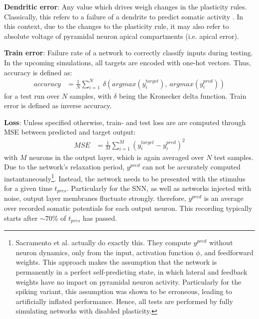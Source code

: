 \textbf{Dendritic error}: Any value which drives weigh changes in the plasticity rules. Classically, this refers to a
failure of a dendrite to predict somatic activity \citep{urbanczik2014learning}. In this context, due to the changes to
the plasticity rule, it may also refer to absolute voltage of pyramidal neuron apical compartments (i.e. apical error).
\newline

\textbf{Train error}: Failure rate of a network to correctly classify inputs during testing. In the upcoming
simulations, all targets are encoded with one-hot vectors. Thus, accuracy is defined as:
\begin{align*}
  accuracy & = \frac{1}{N} \sum_{i=1}^N \  \delta \left(argmax(y^{target}_i),\ argmax(y^{pred}_i) \right)
\end{align*}
for a test run over $N$ samples, with $\delta$ being the Kronecker delta function. Train error is defined as inverse
accuracy.\newline

\textbf{Loss}: Unless specified otherwise, train- and test loss are are computed through MSE between predicted and
target output:
\begin{align*}
  MSE & = \frac{1}{M} \sum_{i=1}^M \left( y^{target}_i-y^{pred}_i \right)^2
\end{align*}
with $M$ neurons in the output layer, which is again averaged over $N$ test samples. Due to the network's relaxation
period, $y^{pred}$ can not be accurately computed instantaneously\footnote{Sacramento et al. actually do exactly this.
They compute $y^{pred}$ without neuron dynamics, only from the input, activation function $\phi$, and feedforward
weights. This approach makes the assumption that the network is permanently in a perfect self-predicting state, in which
lateral and feedback weights have no impact on pyramidal neuron activity. Particularly for the spiking variant, this
assumption was shown to be erroneous, leading to artificially inflated performance. Hence, all tests are performed by
fully simulating networks with disabled plasticity.}. Instead, the network needs to be presented with the stimulus for a
given time $t_{pres}$. Particularly for the SNN, as well as networks injected with noise, output layer membranes
fluctuate strongly. therefore, $y^{pred}$ is an average over recorded somatic potentials for each output neuron. This
recording typically starts after $\sim 70\%$ of $t_{pres}$ has passed.